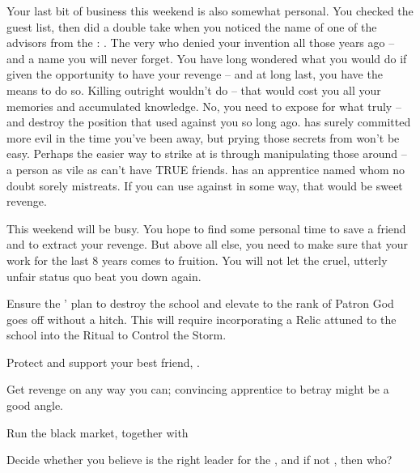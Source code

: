 \documentclass[char]{GL2020}
\begin{document}
Your last bit of business this weekend is also somewhat personal. You checked the guest list, then did a double take when you noticed the name of one of the advisors from the \pTech{}: \cAntiChup{\full}. The very \cAntiChup{\cleric} who denied your invention all those years ago -- and a name you will never forget. You have long wondered what you would do if given the opportunity to have your revenge -- and at long last, you have the means to do so. Killing \cAntiChup{} outright wouldn't do -- that would cost you all your memories and accumulated knowledge. No, you need to expose \cAntiChup{\them} for what \cAntiChup{\they} truly \cAntiChup{\are} -- and destroy the position that \cAntiChup{\they} used against you so long ago. \cAntiChup{} has surely committed more evil in the time you've been away, but prying those secrets from \cAntiChup{\them} won't be easy. Perhaps the easier way to strike at \cAntiChup{\them} is through manipulating those around \cAntiChup{\them} -- a person as vile as \cAntiChup{} can't have TRUE friends. \cAntiChup{} has an apprentice named \cScholarship{\full} whom \cAntiChup{\they} no doubt sorely mistreats. If you can use \cScholarship{\them} against \cAntiChup{\them} in some way, that would be sweet revenge.

This weekend will be busy. You hope to find some personal time to save a friend and to extract your revenge. But above all else, you need to make sure that your work for the last 8 years comes to fruition. You will not let the cruel, utterly unfair status quo beat you down again. 

\begin{itemz}
	\item Ensure the \pGoaties{}' plan to destroy the school and elevate \cGenesis{} to the rank of Patron God goes off without a hitch. This will require incorporating a Relic attuned to the school into the Ritual to Control the Storm.
	\item Protect and support your best friend, \cHeadScientist{}.
	\item Get revenge on \cAntiChup{} any way you can; convincing \cAntiChup{\their} apprentice \cScholarship{} to betray \cAntiChup{\them} might be a good angle.
	\item Run the black market, together with \cChupSecond{}
	\item Decide whether you believe \cChupLeader{} is the right leader for the \pGoaties{}, and if not \cChupLeader{\them}, then who?
\end{itemz}
\end{document}
